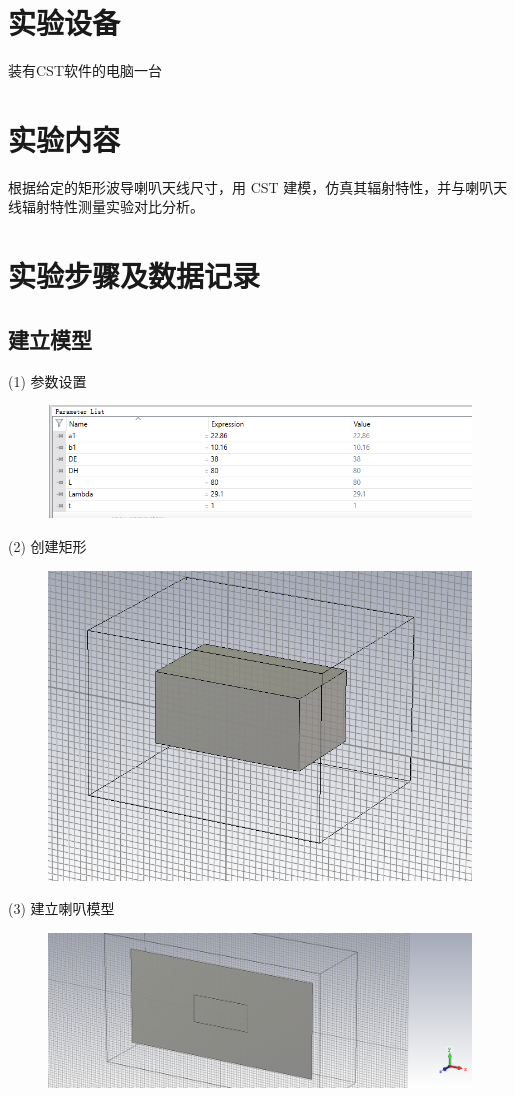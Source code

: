 \documentclass{source/Report}
\begin{document}
\section{实验设备}
装有CST软件的电脑\qquad 一台
\section{实验内容}
根据给定的矩形波导喇叭天线尺寸，用 CST 建模，仿真其辐射特性，并与喇叭天线辐射特性测量实验对比分析。
\section{实验步骤及数据记录}
\subsection{建立模型}
(1) 参数设置
\begin{figure}[H]
    \begin{center}
        \includegraphics[width=\linewidth]{pic/cb2_p2.png}
        \caption{}
    \end{center}
\end{figure}
(2) 创建矩形
\begin{figure}[H]
    \begin{center}
        \includegraphics[width=0.45\linewidth]{pic/cb2_p3.png}
        \caption{}
    \end{center}
\end{figure}
(3) 建立喇叭模型
\begin{figure}[H]
    \begin{center}
        \includegraphics[width=0.7\linewidth]{pic/cb2_p4.png}
        \caption{}
    \end{center}
\end{figure}
\end{document}
